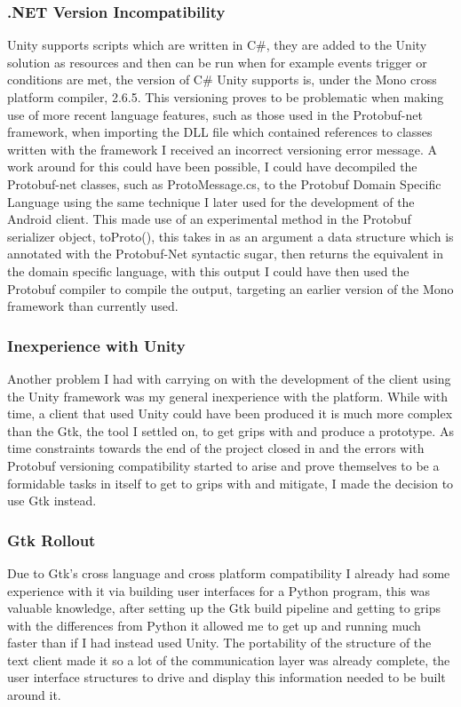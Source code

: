 \documentclass{article}
\begin{document}
\subsubsection{.NET Version Incompatibility}

Unity supports scripts which are written in C\#, they are added to the Unity solution as resources and then can be run when for example events trigger or conditions are met, the version of C\# Unity supports is, under the Mono cross platform compiler, 2.6.5. This versioning proves to be problematic when making use of more recent language features, such as those used in the Protobuf-net framework, when importing the DLL file which contained references to classes written with the framework I received an incorrect versioning error message. A work around for this could have been possible, I could have decompiled the Protobuf-net classes, such as ProtoMessage.cs, to the Protobuf Domain Specific Language using the same technique I later used for the development of the Android client. This made use of an experimental method in the Protobuf serializer object, toProto(), this takes in as an argument a data structure which is annotated with the Protobuf-Net syntactic sugar, then returns the equivalent in the domain specific language, with this output I could have then used the Protobuf compiler to compile the output, targeting an earlier version of the Mono framework than currently used.

\subsubsection{Inexperience with Unity}

Another problem I had with carrying on with the development of the client using the Unity framework was my general inexperience with the platform. While with time, a client that used Unity could have been produced it is much more complex than the Gtk, the tool I settled on, to get grips with and produce a prototype. As time constraints towards the end of the project closed in and the errors with Protobuf versioning compatibility started to arise and prove themselves to be a formidable tasks in itself to get to grips with and mitigate, I made the decision to use Gtk instead.

\subsubsection{Gtk Rollout}

Due to Gtk’s cross language and cross platform compatibility I already had some experience with it via building user interfaces for a Python program, this was valuable knowledge, after setting up the Gtk build pipeline and getting to grips with the differences from Python it allowed me to get up and running much faster than if I had instead used Unity. The portability of the structure of the text client made it so a lot of the communication layer was already complete, the user interface structures to drive and display this information needed to be built around it.
\end{document}

